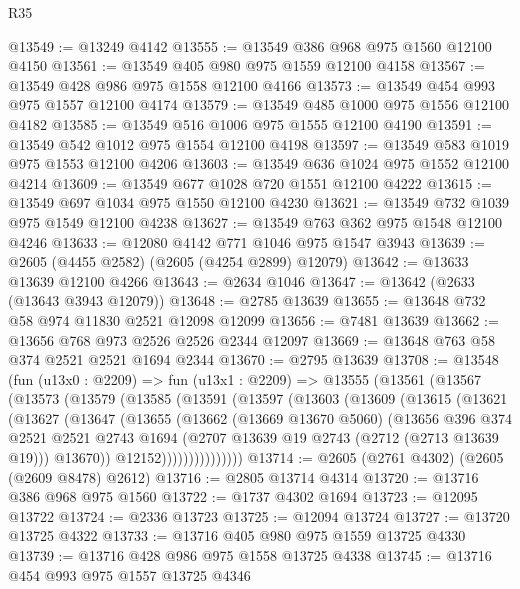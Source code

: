 \begin{lexlean}{R35}
\begin{coremodule}
@13549 := @13249 @4142
@13555 := @13549 @386 @968 @975 @1560 @12100 @4150
@13561 := @13549 @405 @980 @975 @1559 @12100 @4158
@13567 := @13549 @428 @986 @975 @1558 @12100 @4166
@13573 := @13549 @454 @993 @975 @1557 @12100 @4174
@13579 := @13549 @485 @1000 @975 @1556 @12100 @4182
@13585 := @13549 @516 @1006 @975 @1555 @12100 @4190
@13591 := @13549 @542 @1012 @975 @1554 @12100 @4198
@13597 := @13549 @583 @1019 @975 @1553 @12100 @4206
@13603 := @13549 @636 @1024 @975 @1552 @12100 @4214
@13609 := @13549 @677 @1028 @720 @1551 @12100 @4222
@13615 := @13549 @697 @1034 @975 @1550 @12100 @4230
@13621 := @13549 @732 @1039 @975 @1549 @12100 @4238
@13627 := @13549 @763 @362 @975 @1548 @12100 @4246
@13633 := @12080 @4142 @771 @1046 @975 @1547 @3943
@13639 := @2605 (@4455 @2582) (@2605 (@4254 @2899) @12079)
@13642 := @13633 @13639 @12100 @4266
@13643 := @2634 @1046
@13647 := @13642 (@2633 (@13643 @3943 @12079))
@13648 := @2785 @13639
@13655 := @13648 @732 @58 @974 @11830 @2521 @12098 @12099
@13656 := @7481 @13639
@13662 := @13656 @768 @973 @2526 @2526 @2344 @12097
@13669 := @13648 @763 @58 @374 @2521 @2521 @1694 @2344
@13670 := @2795 @13639
@13708 := @13548
    (fun (u13x0 : @2209) =>
    fun (u13x1 : @2209) =>
    @13555
      (@13561
        (@13567
          (@13573
            (@13579
              (@13585
                (@13591
                  (@13597
                    (@13603
                      (@13609
                        (@13615
                          (@13621
                            (@13627
                              (@13647
                                (@13655
                                  (@13662
                                    (@13669 @13670 @5060)
                                    (@13656
                                      @396
                                      @374
                                      @2521
                                      @2521
                                      @2743
                                      @1694
                                      (@2707 @13639 @19 @2743 (@2712 (@2713 @13639 @19)))
                                      @13670))
                                  @12152)))))))))))))))
@13714 := @2605 (@2761 @4302) (@2605 (@2609 @8478) @2612)
@13716 := @2805 @13714 @4314
@13720 := @13716 @386 @968 @975 @1560
@13722 := @1737 @4302 @1694
@13723 := @12095 @13722
@13724 := @2336 @13723
@13725 := @12094 @13724
@13727 := @13720 @13725 @4322
@13733 := @13716 @405 @980 @975 @1559 @13725 @4330
@13739 := @13716 @428 @986 @975 @1558 @13725 @4338
@13745 := @13716 @454 @993 @975 @1557 @13725 @4346

\end{coremodule}
\end{lexlean}
